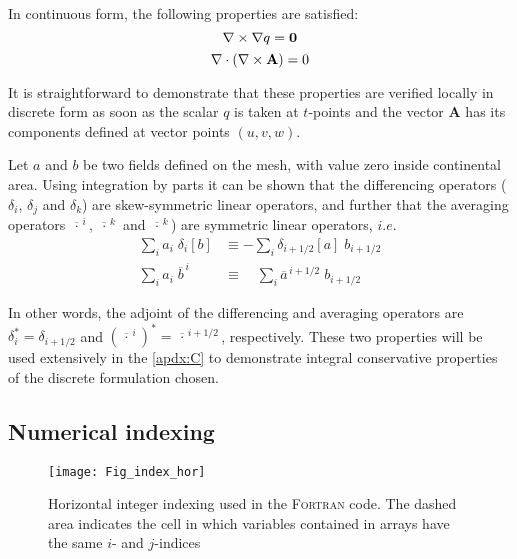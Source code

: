 \documentclass[../main/NEMO_manual]{subfiles}
\begin{document}
In continuous form, the following properties are satisfied:
\begin{equation}
  \label{eq:DOM_curl_grad}
  \nabla \times \nabla q ={\rm {\bf {0}}}
\end{equation}
\begin{equation}
  \label{eq:DOM_div_curl}
  \nabla \cdot \left( {\nabla \times {\rm {\bf A}}} \right)=0
\end{equation}

It is straightforward to demonstrate that these properties are verified locally in discrete form as soon as
the scalar $q$ is taken at $t$-points and
the vector \textbf{A} has its components defined at vector points $(u,v,w)$.

Let $a$ and $b$ be two fields defined on the mesh, with value zero inside continental area.
Using integration by parts it can be shown that
the differencing operators ($\delta_i$, $\delta_j$ and $\delta_k$) are skew-symmetric linear operators,
and further that the averaging operators $\overline{\,\cdot\,}^{\,i}$, $\overline{\,\cdot\,}^{\,k}$ and
$\overline{\,\cdot\,}^{\,k}$) are symmetric linear operators,
$i.e.$
\begin{align}
  \label{eq:DOM_di_adj}
  \sum\limits_i { a_i \;\delta_i \left[ b \right]}
  &\equiv -\sum\limits_i {\delta_{i+1/2} \left[ a \right]\;b_{i+1/2} }      \\
  \label{eq:DOM_mi_adj}
  \sum\limits_i { a_i \;\overline b^{\,i}}
  & \equiv \quad \sum\limits_i {\overline a ^{\,i+1/2}\;b_{i+1/2} }
\end{align}

In other words, the adjoint of the differencing and averaging operators are $\delta_i^*=\delta_{i+1/2}$ and 
${(\overline{\,\cdot \,}^{\,i})}^*= \overline{\,\cdot\,}^{\,i+1/2}$, respectively. 
These two properties will be used extensively in the \autoref{apdx:C} to
demonstrate integral conservative properties of the discrete formulation chosen.

\subsection{Numerical indexing}
\label{subsec:DOM_Num_Index}

\begin{figure}[!tb]
  \begin{center}
    \texttt{[image: Fig\_index\_hor]}
    \caption{
      \protect\label{fig:index_hor}
      Horizontal integer indexing used in the \textsc{Fortran} code.
      The dashed area indicates the cell in which variables contained in arrays have the same $i$- and $j$-indices
    }
  \end{center}
\end{figure}
\end{document}
